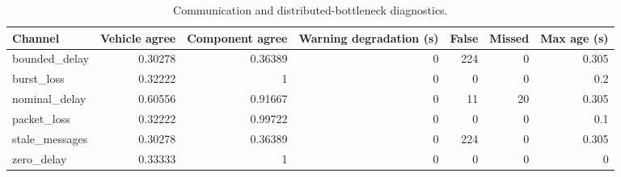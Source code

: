 \begin{table}[!t]
\centering
\scriptsize
\caption{Communication and distributed-bottleneck diagnostics.}
\label{tab:phase2m-communication}
\begin{tabular}{lrrrrrr}
\hline
Channel & Vehicle agree & Component agree & Warning degradation (s) & False & Missed & Max age (s) \\
\hline
bounded\_delay & 0.30278 & 0.36389 & 0 & 224 & 0 & 0.305 \\
burst\_loss & 0.32222 & 1 & 0 & 0 & 0 & 0.2 \\
nominal\_delay & 0.60556 & 0.91667 & 0 & 11 & 20 & 0.305 \\
packet\_loss & 0.32222 & 0.99722 & 0 & 0 & 0 & 0.1 \\
stale\_messages & 0.30278 & 0.36389 & 0 & 224 & 0 & 0.305 \\
zero\_delay & 0.33333 & 1 & 0 & 0 & 0 & 0 \\
\hline
\end{tabular}
\end{table}
